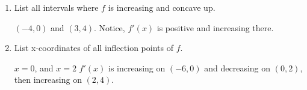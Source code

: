 \documentclass{ximera}
\begin{document}
\begin{problem}
\begin{enumerate}
\begin{explanation}
			\end{explanation}
		\item List all intervals where $f$ is increasing and concave up.
		\begin{explanation}
			$(-4,0)$ and $(3,4)$.
			Notice, $f'(x)$ is positive and increasing there. 
			\end{explanation}
		\item List x-coordinates of all inflection points of $f$. 
		\begin{explanation}
			$x=0$, and $x=2$  $f'(x)$ is increasing on $(-6,0)$ and decreasing on $(0,2)$, then increasing on $(2,4)$.
			\end{explanation}
	\end{enumerate}

\end{problem}
\end{document}

